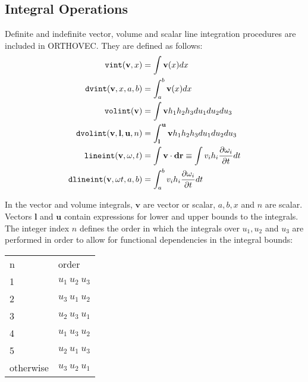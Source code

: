 \subsection{Integral Operations}
Definite and indefinite vector, volume and scalar line integration
procedures are included in \textsc{ORTHOVEC}.  They are defined as follows:
 
 
 
\hypertarget{operator:VINT}{}
\hypertarget{operator:DVINT}{}
\hypertarget{operator:VOLINT}{}
\hypertarget{operator:DVOLINT}{}
\hypertarget{operator:LINEINT_OV}{}
\hypertarget{operator:DLINEINT}{}
\begin{align*}
\f{vint} (\mathbf{v},x) & =  \int \mathbf{v}(x)dx\\
%
\f{dvint} (\mathbf{v},x, a, b) & =  \int^{b}_{a} \mathbf{v} (x) dx\\
%
\f{volint} (\mathbf{v}) & =  \int \mathbf{v} h_{1} h_{2} h_{3} du_{1} du_{2} du_{3}\\
%
\f{dvolint}(\mathbf{v},\mathbf{l},\mathbf{u},n) & = \int^{\mathbf{u}}_{\mathbf{l}}
\mathbf{v} h_{1} h_{2} h_{3} du_{1} du_{2} du_{3}\\
%
\f{lineint} (\mathbf{v, \omega}, t) & =  \int \mathbf{v} \cdot \mathbf{dr}
\equiv \int v_{i} h_{i} \frac{\partial \omega_{i}}{\partial t} dt\\
%
\f{dlineint} (\mathbf{v, \omega} t, a, b) & = \int^{b}_{a} v_i h_i
\frac{\partial \omega_{i}}{\partial t} dt
\end{align*}

In the vector and volume integrals, $\mathbf{v}$ are vector or scalar,
$a, b,x$ and $n$ are scalar.  Vectors $\mathbf{l}$ and $\mathbf{u}$ contain
expressions for lower and upper bounds to the integrals.  The integer
index $n$ defines the order in which the integrals over $u_1, u_2$ and
$u_3$ are performed in order to allow for functional dependencies in
the integral bounds:

\begin{center} 
\begin{tabular}{ll}
n & order\\ 1 & $u_1~u_2~u_3$\\
%
2 & $u_3~u_1~u_2$\\
%
3 & $u_2~u_3~u_1$\\
%
4 & $u_1~u_3~u_2$\\
%
5 & $u_2~u_1~u_3$\\ otherwise & $u_3~u_2~u_1$\\
\end{tabular}
\end{center}


